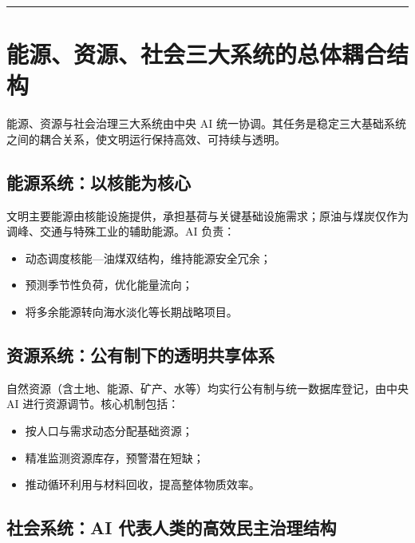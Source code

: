 \begin{center}\rule{0.5\linewidth}{0.5pt}\end{center}

\section{能源、资源、社会三大系统的总体耦合结构}\label{ux80fdux6e90ux8d44ux6e90ux793eux4f1aux4e09ux5927ux7cfbux7edfux7684ux603bux4f53ux8026ux5408ux7ed3ux6784}

能源、资源与社会治理三大系统由中央 AI 统一协调。其任务是稳定三大基础系统之间的耦合关系，使文明运行保持高效、可持续与透明。

\subsection{能源系统：以核能为核心}\label{ux80fdux6e90ux7cfbux7edfux4ee5ux6838ux80fdux4e3aux6838ux5fc3}

文明主要能源由核能设施提供，承担基荷与关键基础设施需求；原油与煤炭仅作为调峰、交通与特殊工业的辅助能源。AI 负责：

\begin{itemize}
\item
  动态调度核能---油煤双结构，维持能源安全冗余；
\item
  预测季节性负荷，优化能量流向；
\item
  将多余能源转向海水淡化等长期战略项目。
\end{itemize}

\subsection{资源系统：公有制下的透明共享体系}\label{ux8d44ux6e90ux7cfbux7edfux516cux6709ux5236ux4e0bux7684ux900fux660eux5171ux4eabux4f53ux7cfb}

自然资源（含土地、能源、矿产、水等）均实行公有制与统一数据库登记，由中央 AI 进行资源调节。核心机制包括：

\begin{itemize}
\item
  按人口与需求动态分配基础资源；
\item
  精准监测资源库存，预警潜在短缺；
\item
  推动循环利用与材料回收，提高整体物质效率。
\end{itemize}

\subsection{社会系统：AI 代表人类的高效民主治理结构}\label{ux793eux4f1aux7cfbux7edfai-ux4ee3ux8868ux4ebaux7c7bux7684ux9ad8ux6548ux6c11ux4e3bux6cbbux7406ux7ed3ux6784}

